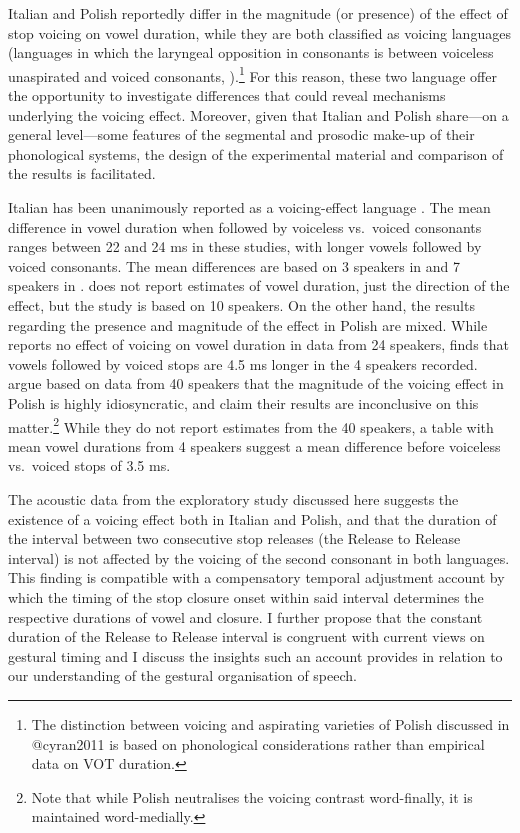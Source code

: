 \documentclass[12pt,]{article}
\let\rmarkdownfootnote\footnote%
\def\footnote{\protect\rmarkdownfootnote}
\begin{document}
Italian and Polish reportedly differ in the magnitude (or presence) of
the effect of stop voicing on vowel duration, while they are both
classified as voicing languages (languages in which the laryngeal
opposition in consonants is between voiceless unaspirated and voiced
consonants,
\citealt{beckman2013}).\footnote{The distinction between voicing and aspirating varieties of Polish discussed in @cyran2011 is based on phonological considerations rather than empirical data on VOT duration.
} For this reason, these two language offer the opportunity to
investigate differences that could reveal mechanisms underlying the
voicing effect. Moreover, given that Italian and Polish share---on a
general level---some features of the segmental and prosodic make-up of
their phonological systems, the design of the experimental material and
comparison of the results is facilitated.

Italian has been unanimously reported as a voicing-effect language
\citep{caldognetto1979, farnetani1986, esposito2002}. The mean
difference in vowel duration when followed by voiceless vs.~voiced
consonants ranges between 22 and 24 ms in these studies, with longer
vowels followed by voiced consonants. The mean differences are based on
3 speakers in \citealt{farnetani1986} and 7 speakers in
\citealt{esposito2002}. \citealt{caldognetto1979} does not report
estimates of vowel duration, just the direction of the effect, but the
study is based on 10 speakers. On the other hand, the results regarding
the presence and magnitude of the effect in Polish are mixed. While
\citet{keating1984} reports no effect of voicing on vowel duration in
data from 24 speakers, \citet{nowak2006} finds that vowels followed by
voiced stops are 4.5 ms longer in the 4 speakers recorded.
\citet{malisz2008} argue based on data from 40 speakers that the
magnitude of the voicing effect in Polish is highly idiosyncratic, and
claim their results are inconclusive on this
matter.\footnote{Note that while Polish neutralises the voicing contrast word-finally, it is maintained word-medially.}
While they do not report estimates from the 40 speakers, a table with
mean vowel durations from 4 speakers suggest a mean difference before
voiceless vs.~voiced stops of 3.5 ms.

The acoustic data from the exploratory study discussed here suggests the
existence of a voicing effect both in Italian and Polish, and that the
duration of the interval between two consecutive stop releases (the
Release to Release interval) is not affected by the voicing of the
second consonant in both languages. This finding is compatible with a
compensatory temporal adjustment account by which the timing of the stop
closure onset within said interval determines the respective durations
of vowel and closure. I further propose that the constant duration of
the Release to Release interval is congruent with current views on
gestural timing \citep{goldstein2014} and I discuss the insights such an
account provides in relation to our understanding of the gestural
organisation of speech.
\end{document}
